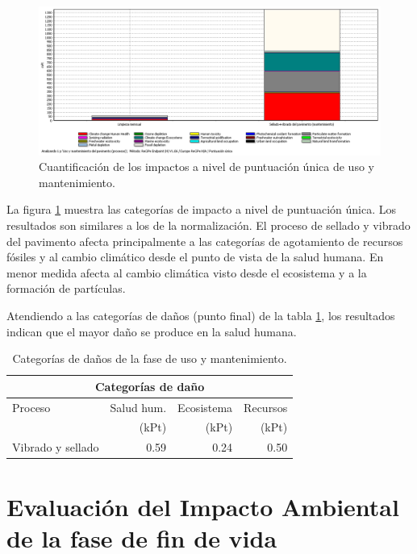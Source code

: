 \begin{figure}[!htb]
\centering
\includegraphics[width=15cm]{img/uso_puntuacionunica.png}
\caption{Cuantificación de los impactos a nivel de puntuación única de uso y mantenimiento.}
\label{fig:uso_puntuacionunica}
\end{figure}

La figura \ref{fig:uso_puntuacionunica} muestra las categorías de impacto a nivel de puntuación única. Los resultados son similares a los de la normalización. El proceso de sellado y vibrado del pavimento afecta principalmente a las categorías de agotamiento de recursos fósiles y al cambio climático desde el punto de vista de la salud humana. En menor medida afecta al cambio climática visto desde el ecosistema y a la formación de partículas.

Atendiendo a las categorías de daños (punto final) de la tabla \ref{categoriasdanosuso}, los resultados indican que el mayor daño se produce en la salud humana.

\begin{table}[!htb]
\centering
\begin{tabular}{p{6cm}rrr}
\toprule
\multicolumn{4}{c}{Categorías de daño}\\
\midrule
Proceso & Salud hum. & Ecosistema & Recursos\\
& (kPt) &  (kPt) &  (kPt)\\
\midrule
Vibrado y sellado & 0.59 & 0.24 & 0.50\\
\bottomrule
\end{tabular}
\caption{Categorías de daños de la fase de uso y mantenimiento.}
\label{categoriasdanosuso}
\end{table}

\section{Evaluación del Impacto Ambiental de la fase de fin de vida}

